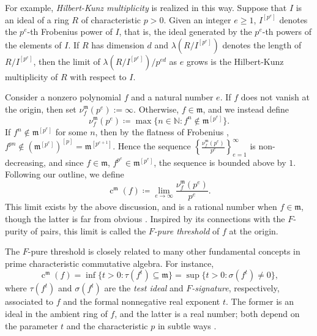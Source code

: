 \documentclass{amsart}
\newcommand{\ft}{\operatorname{c}}
\newcommand{\idealm}{\mathfrak{m}}
\renewcommand{\geq}{\geqslant}
\begin{document}
For example, \emph{Hilbert-Kunz multiplicity} is realized in this way. 
Suppose that $I$ is an ideal of a ring $R$ of characteristic $p>0$.
Given an integer $e \geq 1$, 
$I^{[p^e]}$ denotes the $p^e$-th Frobenius power of $I$, that is, the ideal generated by the $p^e$-th powers of the elements of $I$. 
If $R$ has dimension $d$ and $\lambda\left(R/I^{[p^e]}\right)$ denotes the length of $R/I^{[p^e]}$, 
then the limit of $\lambda\left(R/I^{[p^e]}\right)/p^{ed}$ as $e$ grows is the Hilbert-Kunz multiplicity of $R$ with respect to $I$. 

Consider a nonzero polynomial $f$ and a natural number $e$.  If $f$ does not vanish at the origin, then set $\nu_f^{\idealm}(p^e) := \infty$.  Otherwise, $f \in \idealm$, and we instead define
\[ \nu_f^{\idealm}(p^e) \coloneqq  \max \{ n \in \mathbb{N} : f^n \notin \idealm^{[p^e]} \}. \]
If $f^n \notin \idealm^{[p^e]}$ for some $n$, then by the flatness of Frobenius \cite{KunzCharacterizationsOfRegularLocalRings}, $f^{pn} \notin \left( \idealm^{[p^e]} \right)^{[p]} = \idealm^{[p^{e+1}]}$. 
Hence the sequence $\left\{ \frac{ \nu_f^{\idealm}(p^e)}{p^e} \right\}_{e=1}^\infty$ is non-decreasing, and since $f \in \idealm$, $f^{p^e} \in \idealm^{[p^e]}$, the sequence is bounded above by $1$.  
Following our outline,  we define
\[ \ft^{\idealm}(f) \coloneqq  \lim_{e \to \infty} \frac{ \nu_f^{\idealm}(p^e)}{p^e}. \]
This limit exists by the above discussion, and is a rational number when $f\in \idealm$, though the latter is far from obvious  \cite{BlickleMustataSmithDiscretenessAndRationalityOfFThresholds}.
Inspired by its connections with the $F$-purity of pairs,  this limit is called the \emph{$F$-pure threshold} of $f$ at the origin.

The $F$-pure threshold is closely related to many other fundamental concepts in prime characteristic commutative algebra.   For instance,
\[ \ft^{\idealm}(f) = \inf \{ t>0 : \tau(f^t)  \subseteq \idealm \} = \sup \{ t>0 : \sigma( f^t) \neq 0 \}, \]
where $\tau(f^t)$ and $\sigma(f^t)$ are the \emph{test ideal} and \emph{$F$-signature}, respectively, associated to $f$ and the formal nonnegative real exponent $t$.  The former is an ideal in the ambient ring of $f$, and the latter is a real number;  both depend on the parameter $t$ and the characteristic $p$ in subtle ways \cite{BlickleMustataSmithDiscretenessAndRationalityOfFThresholds, BlickleSchwedeTuckerFSigPairs1}.
\end{document}
